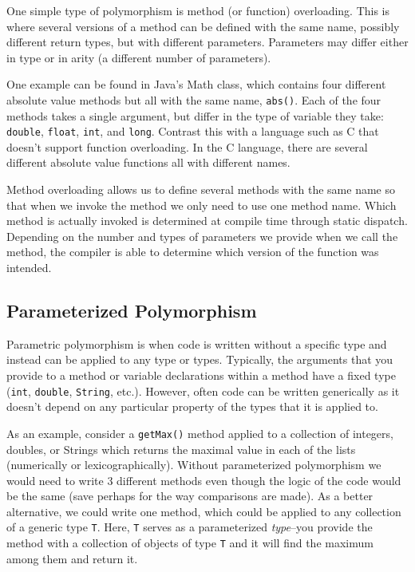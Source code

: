 \documentclass[12pt]{scrartcl}
\begin{document}
One simple type of polymorphism is method (or function) overloading.  
This is where several versions of a method can be defined with the 
same name, possibly different return types, but with different 
parameters.  Parameters may differ either in type or in arity (a 
different number of parameters).

One example can be found in Java's Math class, which contains four 
different absolute value methods but all with the same name, 
\texttt{abs()}.  Each of the four methods takes a single 
argument, but differ in the type of variable they take: 
\texttt{double}, \texttt{float}, \texttt{int}, 
and \texttt{long}.  Contrast this with a language such as
C that doesn't support function overloading.  In the C language, there 
are several different absolute value functions all with different 
names.  

Method overloading allows us to define several methods with the same 
name so that when we invoke the method we only need to use one method 
name.  Which method is actually invoked is determined at compile time 
through static dispatch.  Depending on the number and types of parameters 
we provide when we call the method, the compiler is able to determine 
which version of the function was intended.

\subsection*{Parameterized Polymorphism}

Parametric polymorphism is when code is written without a specific 
type and instead can be applied to any type or types.  Typically, 
the arguments that you provide to a method or variable declarations 
within a method have a fixed type (\texttt{int}, 
\texttt{double}, \texttt{String}, etc.).  
However,  often code can be written generically as it doesn't depend 
on any particular property of the types that it is applied to.

As an example, consider a \texttt{getMax()} method applied 
to a collection of integers, doubles, or Strings which returns the 
maximal value in each of the lists (numerically or lexicographically).  
Without parameterized polymorphism we would need to write 3 different 
methods even though the logic of the code would be the same (save 
perhaps for the way comparisons are made).  As a better alternative, 
we could write one method, which could be applied to any collection 
of a generic type \texttt{T}.  Here, \texttt{T} 
serves as a parameterized \emph{type}--you provide the method with 
a collection of objects of type \texttt{T} and it will 
find the maximum among them and return it. 
\end{document}
